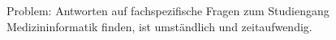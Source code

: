 Problem: Antworten auf fachspezifische Fragen zum Studiengang Medizininformatik finden, ist umständlich und zeitaufwendig.



